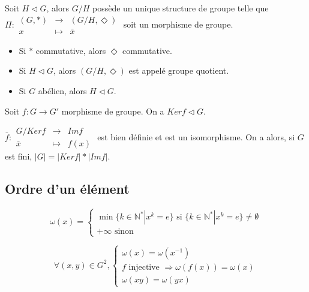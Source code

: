 \begin{prop} Soit $H \lhd G$, alors $G/H$ possède un unique structure de groupe telle que \\$\Pi :\begin{array}{ccc} (G, *) & \rightarrow & (G/H, \Diamond) \\ x & \mapsto & \bar{x}\end{array}$ soit un morphisme de groupe.
\end{prop}

\begin{rem} \begin{itemize}
    \item Si $*$ commutative, alors $\Diamond$ commutative.
    \item Si $H \lhd G$, alors $(G/H, \Diamond)$ est appelé groupe quotient.
    \item Si $G$ abélien, alors $H \lhd G$.
\end{itemize}\end{rem}

\begin{prop} Soit $f:G\rightarrow G'$ morphisme de groupe. On a $Kerf \lhd G$.
\end{prop}

\begin{theo} $\bar{f} : \begin{array}{ccc} G/Kerf & \rightarrow & Imf \\ \bar{x} & \mapsto & f(x)\end{array}$ est bien définie et est un isomorphisme. On a alors, si $G$ est fini, $|G| = |Kerf| * |Imf|$.
\end{theo}

\subsection{Ordre d'un élément}
\begin{defi} \[\omega(x) = \left\{\begin{array}{l} \min \{k\in\mathbb{N}^* | x^k = e\} \text{ si } \{k\in\mathbb{N}^* | x^k = e\}\neq\emptyset \\ +\infty\text{ sinon}\end{array}\right.\]
\end{defi}

\begin{prop} \[ \forall (x, y) \in G^2, \left\{\begin{array}{l}
            \omega(x) = \omega(x^{-1}) \\
            f\text{ injective }\Rightarrow \omega(f(x)) = \omega(x) \\
            \omega(xy) = \omega(yx)
    \end{array}\right.\]
\end{prop}

